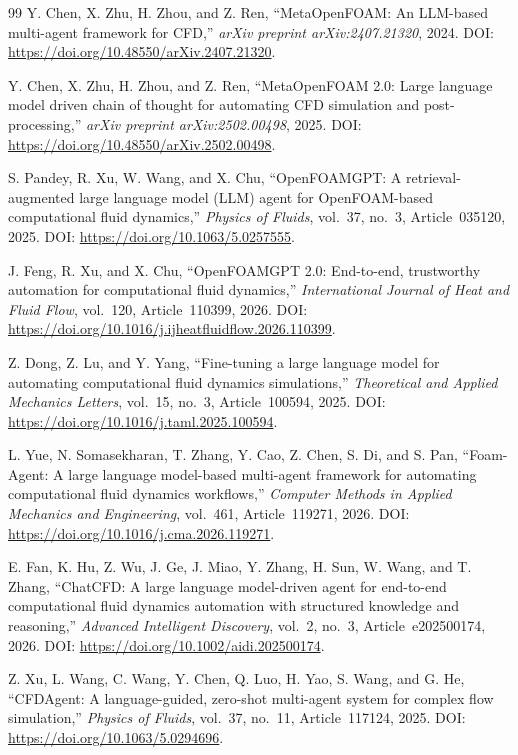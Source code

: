 \documentclass[11pt]{article}
\begin{document}
\begin{thebibliography}{99}
Y. Chen, X. Zhu, H. Zhou, and Z. Ren,
``MetaOpenFOAM: An LLM-based multi-agent framework for CFD,''
\textit{arXiv preprint arXiv:2407.21320}, 2024.
DOI: \url{https://doi.org/10.48550/arXiv.2407.21320}.

Y. Chen, X. Zhu, H. Zhou, and Z. Ren,
``MetaOpenFOAM 2.0: Large language model driven chain of
thought for automating CFD simulation and post-processing,''
\textit{arXiv preprint arXiv:2502.00498}, 2025.
DOI: \url{https://doi.org/10.48550/arXiv.2502.00498}.

S. Pandey, R. Xu, W. Wang, and X. Chu,
``OpenFOAMGPT: A retrieval-augmented large language model
(LLM) agent for OpenFOAM-based computational fluid dynamics,''
\textit{Physics of Fluids}, vol.~37, no.~3,
Article~035120, 2025.
DOI: \url{https://doi.org/10.1063/5.0257555}.

J. Feng, R. Xu, and X. Chu,
``OpenFOAMGPT 2.0: End-to-end, trustworthy automation
for computational fluid dynamics,''
\textit{International Journal of Heat and Fluid Flow},
vol.~120, Article~110399, 2026.
DOI: \url{https://doi.org/10.1016/j.ijheatfluidflow.2026.110399}.

Z. Dong, Z. Lu, and Y. Yang,
``Fine-tuning a large language model for automating
computational fluid dynamics simulations,''
\textit{Theoretical and Applied Mechanics Letters},
vol.~15, no.~3, Article~100594, 2025.
DOI: \url{https://doi.org/10.1016/j.taml.2025.100594}.

L. Yue, N. Somasekharan, T. Zhang, Y. Cao,
Z. Chen, S. Di, and S. Pan,
``Foam-Agent: A large language model-based multi-agent
framework for automating computational fluid dynamics workflows,''
\textit{Computer Methods in Applied Mechanics and Engineering},
vol.~461, Article~119271, 2026.
DOI: \url{https://doi.org/10.1016/j.cma.2026.119271}.

E. Fan, K. Hu, Z. Wu, J. Ge, J. Miao,
Y. Zhang, H. Sun, W. Wang, and T. Zhang,
``ChatCFD: A large language model-driven agent for end-to-end
computational fluid dynamics automation with structured
knowledge and reasoning,''
\textit{Advanced Intelligent Discovery}, vol.~2, no.~3,
Article~e202500174, 2026.
DOI: \url{https://doi.org/10.1002/aidi.202500174}.

Z. Xu, L. Wang, C. Wang, Y. Chen, Q. Luo, H. Yao, S. Wang, and G. He,
``CFDAgent: A language-guided, zero-shot multi-agent system for complex flow
simulation,''
\textit{Physics of Fluids}, vol.~37, no.~11, Article~117124, 2025.
DOI: \url{https://doi.org/10.1063/5.0294696}.


\end{thebibliography}
\end{document}
